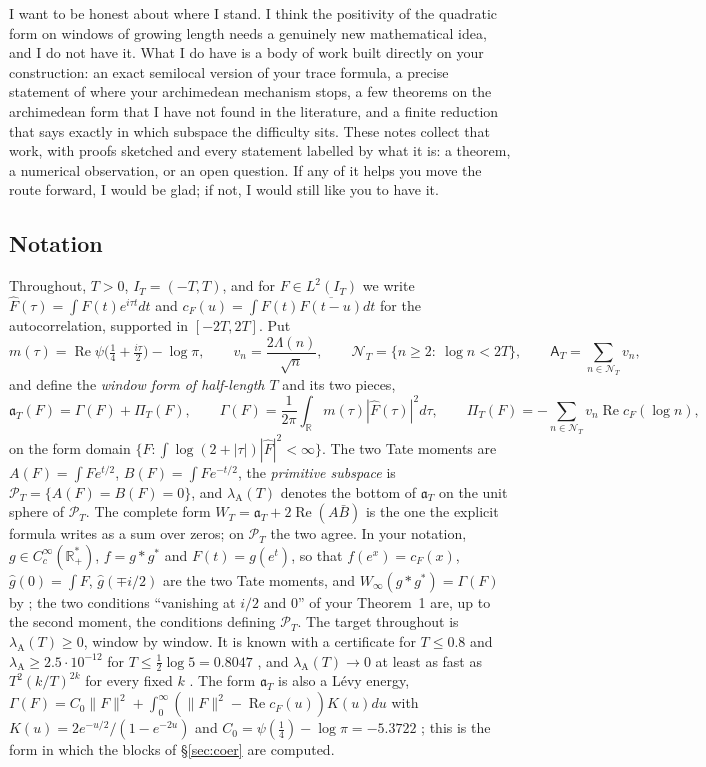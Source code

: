 \documentclass[11pt]{amsart}
\theoremstyle{definition}
\theoremstyle{remark}
\newcommand{\R}{\mathbb R}
\newcommand{\Rel}{\operatorname{Re}}
\newcommand{\IT}{I_T}
\newcommand{\PT}{\mathcal P_T}
\newcommand{\Fh}{\widehat F}
\newcommand{\cF}{c_F}
\newcommand{\NT}{\mathcal N_T}
\newcommand{\Aconst}{\mathsf A_T}
\newcommand{\PiT}{\Pi_T}
\newcommand{\lamA}{\lambda_{\mathrm A}}
\begin{document}
I want to be honest about where I stand. I think the positivity of the quadratic form on windows of
growing length needs a genuinely new mathematical idea, and I do not have it. What I do have is a body of
work built directly on your construction: an exact semilocal version of your trace formula, a precise
statement of where your archimedean mechanism stops, a few theorems on the archimedean form that I have
not found in the literature, and a finite reduction that says exactly in which subspace the difficulty
sits. These notes collect that work, with proofs sketched and every statement labelled by what it is: a
theorem, a numerical observation, or an open question. If any of it helps you move the route forward, I
would be glad; if not, I would still like you to have it.

\subsection*{Notation}
Throughout, $T>0$, $\IT=(-T,T)$, and for $F\in L^2(\IT)$ we write $\Fh(\tau)=\int F(t)e^{i\tau t}dt$ and
$\cF(u)=\int F(t)\overline{F(t-u)}dt$ for the autocorrelation, supported in $[-2T,2T]$. Put
\[
m(\tau)=\Rel\psi\big(\tfrac14+\tfrac{i\tau}2\big)-\log\pi,\qquad v_n=\frac{2\Lambda(n)}{\sqrt n},\qquad
\NT=\{n\ge2:\ \log n<2T\},\qquad \Aconst=\sum_{n\in\NT}v_n,
\]
and define the \emph{window form of half-length $T$} and its two pieces,
\begin{equation}\label{eq:form}
\mathfrak a_T(F)=\Gamma(F)+\PiT(F),\qquad
\Gamma(F)=\frac1{2\pi}\int_\R m(\tau)|\Fh(\tau)|^2d\tau,\qquad
\PiT(F)=-\sum_{n\in\NT}v_n\Rel\cF(\log n),
\end{equation}
on the form domain $\{F:\int\log(2+|\tau|)|\Fh|^2<\infty\}$. The two Tate moments are
$A(F)=\int Fe^{t/2}$, $B(F)=\int Fe^{-t/2}$, the \emph{primitive subspace} is $\PT=\{A(F)=B(F)=0\}$, and
$\lamA(T)$ denotes the bottom of $\mathfrak a_T$ on the unit sphere of $\PT$. The complete form
$W_T=\mathfrak a_T+2\Rel(A\bar B)$ is the one the explicit formula writes as a sum over zeros; on $\PT$ the
two agree. In your notation, $g\in C_c^\infty(\R_+^*)$, $f=g*g^*$ and $F(t)=g(e^t)$, so that $f(e^x)=\cF(x)$,
$\widehat g(0)=\int F$, $\widehat g(\mp i/2)$ are the two Tate moments, and $W_\infty(g*g^*)=\Gamma(F)$ by
\cite[(152)--(154)]{CC2021}; the two conditions ``vanishing at $i/2$ and $0$'' of your Theorem~1 are, up to
the second moment, the conditions defining $\PT$. The target throughout is $\lamA(T)\ge0$, window by window.
It is known with a certificate for $T\le0.8$ \cite{Zhu2026} and $\lamA\ge2.5\cdot10^{-12}$ for
$T\le\frac12\log5=0.8047$ \cite[certificate at half-length 0.8047]{Paper47}, and $\lamA(T)\to0$ at least as fast as
$T^2(k/T)^{2k}$ for every fixed $k$ \cite[the margin theorem]{Paper47}. The form $\mathfrak a_T$ is also a L\'evy
energy, $\Gamma(F)=C_0\|F\|^2+\int_0^\infty(\|F\|^2-\Rel\cF(u))K(u)du$ with
$K(u)=2e^{-u/2}/(1-e^{-2u})$ and $C_0=\psi(\frac14)-\log\pi=-5.3722$ \cite[the L\'evy-kernel lemma]{Paper47}; this
is the form in which the blocks of \S\ref{sec:coer} are computed.
\end{document}
